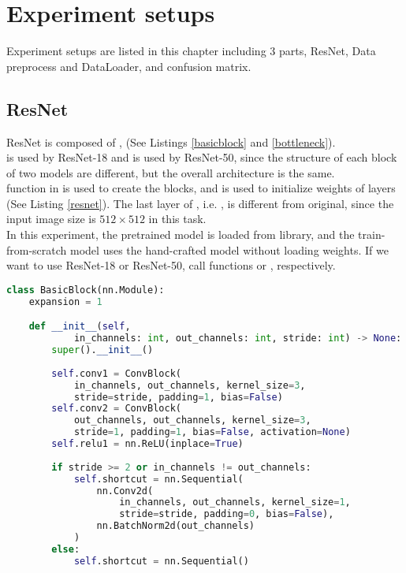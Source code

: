 \chapter{Experiment setups}
\indent
    Experiment setups are listed in this chapter including 3 parts, 
    ResNet, Data preprocess and DataLoader, and confusion matrix.

\section{ResNet}
\indent
	ResNet is composed of ,  (See Listings \ref{basicblock} and \ref{bottleneck}). \\
	 is used by ResNet-18 and  is used by ResNet-50, 
	since the structure of each block of two models are different, but the overall architecture is the same. \\
	 function in  is used to create the blocks, and  is used to initialize weights of layers (See Listing \ref{resnet}).
    The last layer of , i.e. , is different from original, since the input image size is $512 \times 512$ in this task. \\
    In this experiment, the pretrained model is loaded from  library, and 
    the train-from-scratch model uses the hand-crafted model without loading weights. If we want to use ResNet-18 or ResNet-50, 
    call functions  or , respectively.

\begin{lstlisting}[language=Python, caption={Python code of \textcolor{blue}{\textbf{BasicBlock}} (some code is omitted).}, label={basicblock}]
class BasicBlock(nn.Module):
	expansion = 1

	def __init__(self, 
			in_channels: int, out_channels: int, stride: int) -> None:
		super().__init__()
		
		self.conv1 = ConvBlock(
			in_channels, out_channels, kernel_size=3, 
			stride=stride, padding=1, bias=False)
		self.conv2 = ConvBlock(
			out_channels, out_channels, kernel_size=3, 
			stride=1, padding=1, bias=False, activation=None)
		self.relu1 = nn.ReLU(inplace=True)
		
		if stride >= 2 or in_channels != out_channels:
			self.shortcut = nn.Sequential(
				nn.Conv2d(
					in_channels, out_channels, kernel_size=1, 
					stride=stride, padding=0, bias=False),
				nn.BatchNorm2d(out_channels)
			)
		else: 
			self.shortcut = nn.Sequential()\end{lstlisting}


